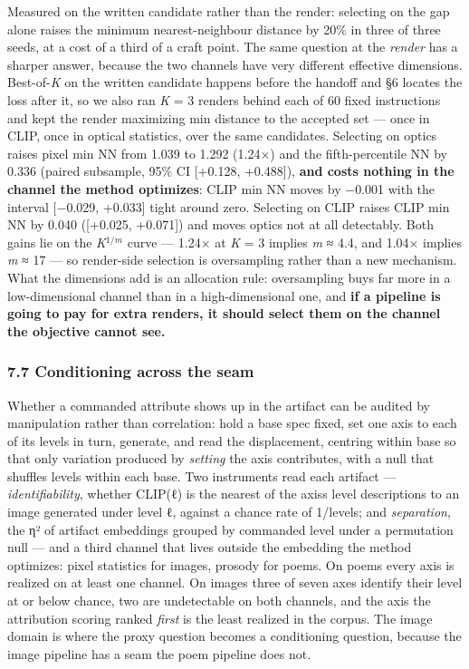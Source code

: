 \documentclass[
  10pt,
]{article}
\theoremstyle{plain}
\theoremstyle{definition}
\begin{document}
Measured on the written candidate rather than the render: selecting on
the gap alone raises the minimum nearest-neighbour distance by 20\% in
three of three seeds, at a cost of a third of a craft point. The same
question at the \emph{render} has a sharper answer, because the two
channels have very different effective dimensions. Best-of-\emph{K} on
the written candidate happens before the handoff and §6 locates the loss
after it, so we also ran \emph{K} = 3 renders behind each of 60 fixed
instructions and kept the render maximizing min distance to the accepted
set --- once in CLIP, once in optical statistics, over the same
candidates. Selecting on optics raises pixel min NN from 1.039 to 1.292
(1.24×) and the fifth-percentile NN by 0.336 (paired subsample, 95\% CI
{[}+0.128, +0.488{]}), \textbf{and costs nothing in the channel the
method optimizes}: CLIP min NN moves by −0.001 with the interval
{[}−0.029, +0.033{]} tight around zero. Selecting on CLIP raises CLIP
min NN by 0.040 ({[}+0.025, +0.071{]}) and moves optics not at all
detectably. Both gains lie on the \emph{K}\(^{1/m}\) curve --- 1.24× at
\emph{K} = 3 implies \emph{m} ≈ 4.4, and 1.04× implies \emph{m} ≈ 17 ---
so render-side selection is oversampling rather than a new mechanism.
What the dimensions add is an allocation rule: oversampling buys far
more in a low-dimensional channel than in a high-dimensional one, and
\textbf{if a pipeline is going to pay for extra renders, it should
select them on the channel the objective cannot see.}

\subsubsection{7.7 Conditioning across the
seam}\label{77-conditioning-across-the-seam}

Whether a commanded attribute shows up in the artifact can be audited by
manipulation rather than correlation: hold a base spec fixed, set one
axis to each of its levels in turn, generate, and read the displacement,
centring within base so that only variation produced by \emph{setting}
the axis contributes, with a null that shuffles levels within each base.
Two instruments read each artifact --- \emph{identifiability}, whether
CLIP(ℓ) is the nearest of the axis\textquotesingle s level descriptions
to an image generated under level ℓ, against a chance rate of
1/\textbar levels\textbar; and \emph{separation}, the η² of artifact
embeddings grouped by commanded level under a permutation null --- and a
third channel that lives outside the embedding the method optimizes:
pixel statistics for images, prosody for poems. On poems every axis is
realized on at least one channel. On images three of seven axes identify
their level at or below chance, two are undetectable on both channels,
and the axis the attribution scoring ranked \emph{first} is the least
realized in the corpus. The image domain is where the proxy question
becomes a conditioning question, because the image pipeline has a seam
the poem pipeline does not.
\end{document}
